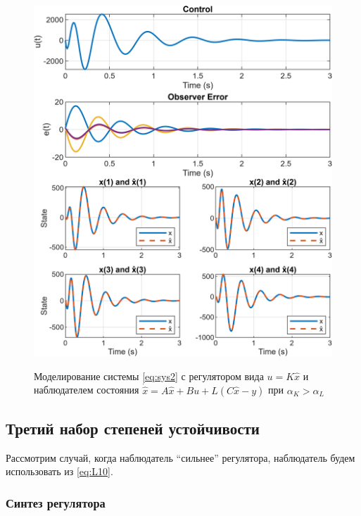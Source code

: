 \begin{figure}[H]
    \centering
    \caption{Моделирование системы \eqref{eq:sys2} с регулятором вида $u=K\hat x$
    и наблюдателем состояния $\dot{\hat x}=A\hat x+Bu+L(C\hat x-y)$ при $\alpha_K>\alpha_L$}
    \includegraphics[width=\linewidth]{figs/task2_2.png}
    \label{fig:22}
\end{figure}


\newpage
\subsection{Третий набор степеней устойчивости}


Рассмотрим случай, когда наблюдатель ``сильнее'' регулятора, наблюдатель будем
использовать из \autoref{eq:L10}.


\subsubsection{Синтез регулятора}

